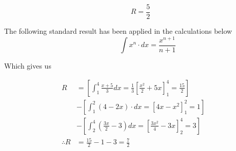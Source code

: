 \documentclass[14pt,fleqn]{extarticle}
\begin{document}
\[ \qquad R = \frac{5}{2}\]

\newcard 

The following standard result has been applied in the calculations below \[\qquad\qquad \int x^n\cdot dx = \frac{x^{n+1}}{n+1}\]

Which gives us 

\begin{align} 
R &= \left[ \int_1^4 \frac{x+5}{3}dx =\frac{1}{3}\left[ \frac{x^2}{2} + 5x \right]_1^4 = \frac{15}{2}\right]\\ 
&- \left[\int_1^2 (4-2x)\cdot dx = \left[ 4x-x^2\right]_1^2 = 1 \right]\\
&- \left[\int_2^4 \left( \frac{3x}{2}-3\right)dx = \left[\frac{3x^2}{4}-3x \right]_2^4 = 3 \right] \\
\therefore R &= \frac{15}{2} - 1 - 3 = \frac{7}{2} 
\end{align}
\end{document}
